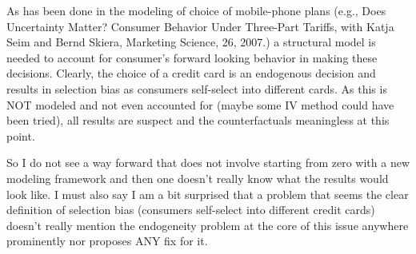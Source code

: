 As has been done in the modeling of choice of mobile-phone plans (e.g., Does Uncertainty Matter? Consumer Behavior Under Three-Part Tariffs, with Katja Seim and Bernd Skiera, Marketing Science, 26, 2007.) a structural model is needed to account for consumer's forward looking behavior in making these decisions. Clearly, the choice of a credit card is an endogenous decision and results in selection bias as consumers self-select into different cards. As this is NOT modeled and not even accounted for (maybe some IV method could have been tried), all results are suspect and the counterfactuals meaningless at this point.

So I do not see a way forward that does not involve starting from zero with a new modeling framework and then one doesn't really know what the results would look like.
  I must also say I am a bit surprised that a problem that seems the clear definition of selection bias (consumers self-select into different credit cards) doesn't really mention the endogeneity problem at the core of this issue anywhere prominently nor proposes ANY fix for it.



